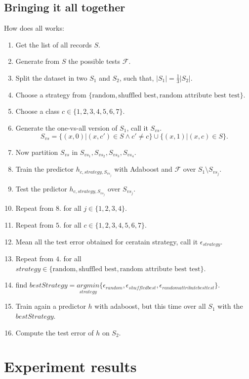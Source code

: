 \documentclass{article}
\begin{document}
\subsection{Bringing it all together}
How does all works:
\begin{enumerate}
	\item Get the list of all records $S$.
	\item Generate from $S$ the possible tests $\mathcal{F}$.
	\item Split the dataset in two $S_1$ and $S_2$, such that, $|S_1| = \frac{1}{3}|S_2|$.
	\item Choose a strategy from $\{\text{random},\text{shuffled best},\text{random attribute best test}\}$.
	\item Choose a class $c \in \{1,2,3,4,5,6,7\}$.
	\item Generate the one-vs-all version of $S_1$, call it $S_{vs}$. 
	$$S_{vs} = \{(x,0)|(x,c') \in S \land c' \neq c\} \cup \{(x,1)|(x,c) \in S\}.$$
	\item Now partition $S_{vs}$ in $S_{vs_1}, S_{vs_2},S_{vs_3},S_{vs_4}$.
	\item Train the predictor $h_{c,strategy, S_{vs_j}}$ with Adaboost and $\mathcal{F}$ over $S_1 \setminus S_{vs_j}$.
	\item Test the prdictor $h_{c,strategy, S_{vs_j}}$ over $S_{vs_j}$.
	\item Repeat from $8.$ for all $j \in \{1,2,3,4\}$.
	\item Repeat from $5.$ for all $c \in \{1,2,3,4,5,6,7\}$.
	\item Mean all the test error obtained for ceratain strategy, call it $\epsilon_{strategy}$.
	\item Repeat from $4.$ for all $strategy \in \{\text{random},\text{shuffled best},\text{random attribute best test}\}$.
	\item find $bestStrategy = \underset{strategy}{argmin}\{\epsilon_{random},\epsilon_{shuffled best},\epsilon_{random attribute best test}\}$.
	\item Train again a predictor $h$ with adaboost, but this time over all $S_1$ with the $bestStrategy$.
	\item Compute the test error of $h$ on $S_2$.

\end{enumerate}

\section{Experiment results}
\end{document}
